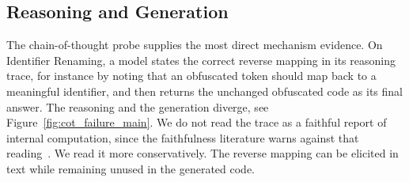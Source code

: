 \subsection{Reasoning and Generation}
\label{sec:cs_mechanism}

The chain-of-thought probe supplies the most direct mechanism evidence. On
Identifier Renaming, a model states the correct reverse mapping in its reasoning
trace, for instance by noting that an obfuscated token should map back to a
meaningful identifier, and then returns the unchanged obfuscated code as its final
answer. The reasoning and the generation diverge, see Figure~\ref{fig:cot_failure_main}. We do not read the trace as a
faithful report of internal computation, since the faithfulness literature warns
against that reading~\cite{lanham2023measuring, turpin2023unfaithful}. We read it
more conservatively. The reverse mapping can be elicited in text while remaining
unused in the generated code.

